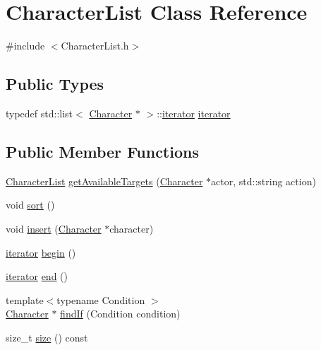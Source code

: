 \hypertarget{class_character_list}{}\section{Character\+List Class Reference}
\label{class_character_list}


{\ttfamily \#include $<$Character\+List.\+h$>$}

\subsection*{Public Types}
\begin{DoxyCompactItemize}
\item 
typedef std\+::list$<$ \hyperlink{class_character}{Character} $\ast$ $>$\+::\hyperlink{class_character_list_ae35338287a6cc6ee2e7c4b78f310d9f9}{iterator} \hyperlink{class_character_list_ae35338287a6cc6ee2e7c4b78f310d9f9}{iterator}
\end{DoxyCompactItemize}
\subsection*{Public Member Functions}
\begin{DoxyCompactItemize}
\item 
\hyperlink{class_character_list}{Character\+List} \hyperlink{class_character_list_a5b91b4cb88c2aea3a01d38a5c9c0cd8c}{get\+Available\+Targets} (\hyperlink{class_character}{Character} $\ast$actor, std\+::string action)
\item 
void \hyperlink{class_character_list_aa57091b62166c958992cdf50bf3918c4}{sort} ()
\item 
void \hyperlink{class_character_list_a31af65cd57dc3b6291a1dc2d00a6b100}{insert} (\hyperlink{class_character}{Character} $\ast$character)
\item 
\hyperlink{class_character_list_ae35338287a6cc6ee2e7c4b78f310d9f9}{iterator} \hyperlink{class_character_list_a3f33d64e8d14d4902864c62adc8a850b}{begin} ()
\item 
\hyperlink{class_character_list_ae35338287a6cc6ee2e7c4b78f310d9f9}{iterator} \hyperlink{class_character_list_a2727c01ea4dba85daa568dcacd0aebd9}{end} ()
\item 
{\footnotesize template$<$typename Condition $>$ }\\\hyperlink{class_character}{Character} $\ast$ \hyperlink{class_character_list_a11abf578cb86b393a3044c491f5a9938}{find\+If} (Condition condition)
\item 
size\+\_\+t \hyperlink{class_character_list_a2c075299a05cd62be318defab063bd42}{size} () const 
\end{DoxyCompactItemize}


